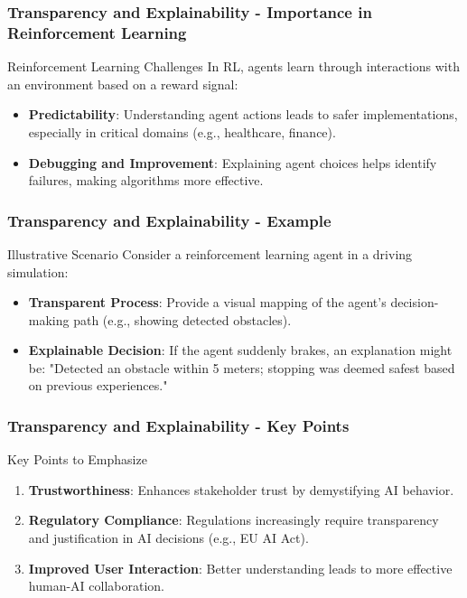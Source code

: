 \documentclass[aspectratio=169]{beamer}
\begin{document}
\begin{frame}[fragile]
    \frametitle{Transparency and Explainability - Importance in Reinforcement Learning}
    \begin{block}{Reinforcement Learning Challenges}
        In RL, agents learn through interactions with an environment based on a reward signal:
        \begin{itemize}
            \item \textbf{Predictability}: Understanding agent actions leads to safer implementations, especially in critical domains (e.g., healthcare, finance).
            \item \textbf{Debugging and Improvement}: Explaining agent choices helps identify failures, making algorithms more effective.
        \end{itemize}
    \end{block}
\end{frame}

\begin{frame}[fragile]
    \frametitle{Transparency and Explainability - Example}
    \begin{block}{Illustrative Scenario}
        Consider a reinforcement learning agent in a driving simulation:
        \begin{itemize}
            \item \textbf{Transparent Process}: Provide a visual mapping of the agent's decision-making path (e.g., showing detected obstacles).
            \item \textbf{Explainable Decision}: If the agent suddenly brakes, an explanation might be: "Detected an obstacle within 5 meters; stopping was deemed safest based on previous experiences."
        \end{itemize}
    \end{block}
\end{frame}

\begin{frame}[fragile]
    \frametitle{Transparency and Explainability - Key Points}
    \begin{block}{Key Points to Emphasize}
        \begin{enumerate}
            \item \textbf{Trustworthiness}: Enhances stakeholder trust by demystifying AI behavior.
            \item \textbf{Regulatory Compliance}: Regulations increasingly require transparency and justification in AI decisions (e.g., EU AI Act).
            \item \textbf{Improved User Interaction}: Better understanding leads to more effective human-AI collaboration.
        \end{enumerate}
    \end{block}
\end{frame}
\end{document}
